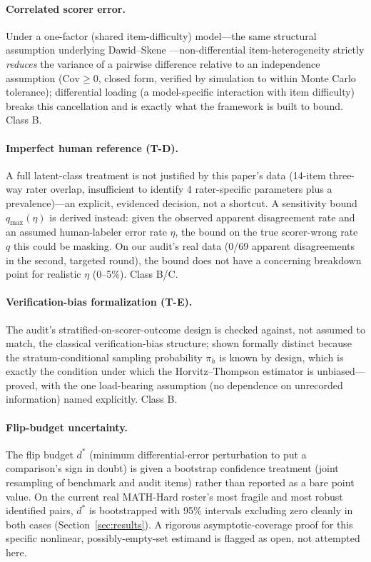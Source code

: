 \paragraph{Correlated scorer error.} Under a one-factor (shared
item-difficulty) model---the same structural assumption underlying
Dawid--Skene \citep{dawid1979maximum}---non-differential item-heterogeneity
strictly \emph{reduces} the variance of a pairwise difference relative to an
independence assumption ($\mathrm{Cov} \geq 0$, closed form, verified by
simulation to within Monte Carlo tolerance); differential loading (a
model-specific interaction with item difficulty) breaks this cancellation
and is exactly what the framework is built to bound. Class B.

\paragraph{Imperfect human reference (T-D).} A full latent-class treatment
\citep{hui1980estimating} is not justified by this paper's data (14-item
three-way rater overlap, insufficient to identify 4 rater-specific
parameters plus a prevalence)---an explicit, evidenced decision, not a
shortcut. A sensitivity bound $q_{\max}(\eta)$ is derived instead: given the
observed apparent disagreement rate and an assumed human-labeler error rate
$\eta$, the bound on the true scorer-wrong rate $q$ this could be masking. On
our audit's real data (0/69 apparent disagreements in the second, targeted
round), the bound does not have a concerning breakdown point for realistic
$\eta$ (0--5\%). Class B/C.

\paragraph{Verification-bias formalization (T-E).} The audit's
stratified-on-scorer-outcome design is checked against, not assumed to
match, the classical verification-bias structure; shown formally distinct
because the stratum-conditional sampling probability $\pi_h$ is known by
design, which is exactly the condition under which the Horvitz--Thompson
estimator \citep{horvitz1952generalization} is unbiased---proved, with the
one load-bearing assumption (no dependence on unrecorded information) named
explicitly. Class B.

\paragraph{Flip-budget uncertainty.} The flip budget $d^\ast$ (minimum
differential-error perturbation to put a comparison's sign in doubt) is
given a bootstrap confidence treatment (joint resampling of benchmark and
audit items) rather than reported as a bare point value. On the current real
MATH-Hard roster's most fragile and most robust identified pairs, $d^\ast$
is bootstrapped with 95\% intervals excluding zero cleanly in both cases
(Section~\ref{sec:results}). A rigorous asymptotic-coverage proof for this
specific nonlinear, possibly-empty-set estimand is flagged as open, not
attempted here.

